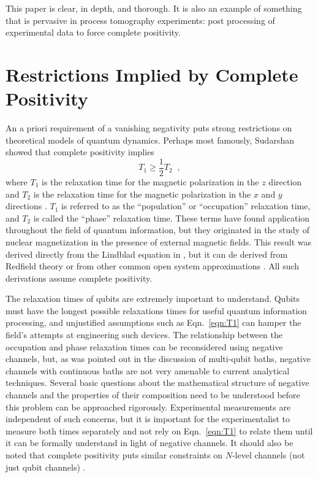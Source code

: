 This paper \cite{Cory2004} is clear, in depth, and thorough.  It is also an example of something that is pervasive in process tomography experiments: post processing of experimental data to force complete positivity.  

\section{Restrictions Implied by Complete Positivity}

An a priori requirement of a vanishing negativity puts strong restrictions on theoretical models of quantum dynamics.  Perhaps most famously, Sudarshan \cite{Sudarshan1976} showed that complete positivity implies 
\begin{equation}
\label{eqn:T1}
T_1 \ge \frac{1}{2} T_2\;\;,
\end{equation}
where $T_1$ is the relaxation time for the magnetic polarization in the $z$ direction and $T_2$ is the relaxation time for the magnetic polarization in the $x$ and $y$ directions \cite{Sudarshan1978,Slichter1996,Bloch1946}.  $T_1$ is referred to as the ``population'' or ``occupation'' relaxation time, and $T_2$ is called the ``phase'' relaxation time.  These terms have found application throughout the field of quantum information, but they originated in the study of nuclear magnetization in the presence of external magnetic fields.  This result was derived directly from the Lindblad equation in \cite{Sudarshan1978}, but it can de derived from Redfield theory \cite{Slichter1996} or from other common open system approximations \cite{Skinner1987} \cite{Skinner1991}.  All such derivations assume complete positivity.  

The relaxation times of qubits are extremely important to understand.  Qubits must have the longest possible relaxations times for useful quantum information processing, and unjustified assumptions such as Eqn.\ \ref{eqn:T1} can hamper the field's attempts at engineering such devices.  The relationship between the occupation and phase relaxation times can be reconsidered using negative channels, but, as was pointed out in the discussion of multi-qubit baths, negative channels with continuous baths are not very amenable to current analytical techniques.  Several basic questions about the mathematical structure of negative channels and the properties of their composition need to be understood before this problem can be approached rigorously.  Experimental measurements are independent of such concerns, but it is important for the experimentalist to measure both times separately and not rely on Eqn.\ \ref{eqn:T1} to relate them until it can be formally understand in light of negative channels.  It should also be noted that complete positivity puts similar constraints on $N$-level channels (not just qubit channels) \cite{Schirmer2004}.

